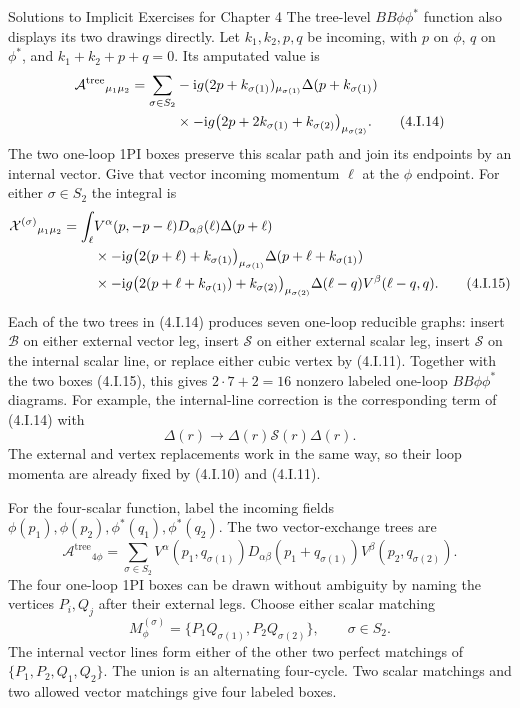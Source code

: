 \begin{bankssolutions}{Solutions to Implicit Exercises for Chapter 4}
The tree-level $BB\phi\phi^*$ function also displays its two drawings
directly.  Let $k_1,k_2,p,q$ be incoming, with $p$ on $\phi$, $q$ on
$\phi^*$, and $k_1+k_2+p+q=0$.  Its amputated value is
\begin{align*}
 \mathcal A^{\mathrm{tree}}{}_{\mu_1\mu_2}
 =\sum_{\sigma\in S_2}&
 -\mathrm{i} g(2p+k_{\sigma(1)})_{\mu_{\sigma(1)}}
 \Delta(p+k_{\sigma(1)})\notag\\
 &\times-\mathrm{i} g\bigl(2p+2k_{\sigma(1)}
 +k_{\sigma(2)}\bigr)_{\mu_{\sigma(2)}}.
 \tag{4.I.14}
\end{align*}
The two one-loop 1PI boxes preserve this scalar path and join its endpoints
by an internal vector.  Give that vector incoming momentum $\ell$ at the
$\phi$ endpoint.  For either $\sigma\in S_2$ the integral is
\begin{align*}
 \mathcal X^{(\sigma)}{}_{\mu_1\mu_2}
 =\int_\ell&
 V^\alpha(p,-p-\ell)D_{\alpha\beta}(\ell)
 \Delta(p+\ell)\notag\\
 &\times -\mathrm{i} g\bigl(2(p+\ell)+k_{\sigma(1)}\bigr)_{\mu_{\sigma(1)}}
 \Delta(p+\ell+k_{\sigma(1)})\notag\\
 &\times -\mathrm{i} g\bigl(2(p+\ell+k_{\sigma(1)})
 +k_{\sigma(2)}\bigr)_{\mu_{\sigma(2)}}
 \Delta(\ell-q)V^\beta(\ell-q,q).
 \tag{4.I.15}
\end{align*}

Each of the two trees in (4.I.14) produces seven one-loop reducible graphs:
insert $\mathcal B$ on either external vector leg, insert $\mathcal S$ on
either external scalar leg, insert $\mathcal S$ on the internal scalar line,
or replace either cubic vertex by (4.I.11).  Together with the two boxes
(4.I.15), this gives $2\cdot7+2=16$ nonzero labeled one-loop
$BB\phi\phi^*$ diagrams.  For example, the internal-line correction is the
corresponding term of (4.I.14) with
\begin{equation*}
 \Delta(r)\longrightarrow
 \Delta(r)\mathcal S(r)\Delta(r).
 \tag{4.I.16}
\end{equation*}
The external and vertex replacements work in the same way, so their loop
momenta are already fixed by (4.I.10) and (4.I.11).

For the four-scalar function, label the incoming fields
$\phi(p_1),\phi(p_2),\phi^*(q_1),\phi^*(q_2)$.  The two vector-exchange trees
are
\begin{equation*}
 \mathcal A^{\mathrm{tree}}{}_{4\phi}
 =\sum_{\sigma\in S_2}
 V^\alpha(p_1,q_{\sigma(1)})
 D_{\alpha\beta}(p_1+q_{\sigma(1)})
 V^\beta(p_2,q_{\sigma(2)}).
 \tag{4.I.17}
\end{equation*}
The four one-loop 1PI boxes can be drawn without ambiguity by naming the
vertices $P_i,Q_j$ after their external legs.  Choose either scalar matching
\begin{equation*}
 M_\phi^{(\sigma)}
 =\{P_1Q_{\sigma(1)},P_2Q_{\sigma(2)}\},
 \qquad \sigma\in S_2.
\end{equation*}
The internal vector lines form either of the other two perfect matchings of
$\{P_1,P_2,Q_1,Q_2\}$.  The union is an alternating four-cycle.  Two scalar
matchings and two allowed vector matchings give four labeled boxes.


\end{bankssolutions}
